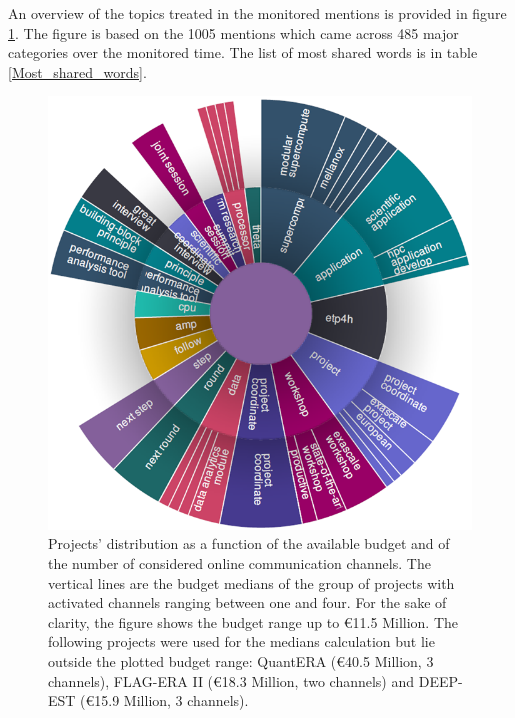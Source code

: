 An overview of the topics treated in the monitored mentions is provided in figure \ref{HPC_word_burst}. The figure is based on the 1005 mentions which came across 485 major categories over the monitored time. The list of most shared words is in table \ref{Most_shared_words}. 

\begin{figure}[!t] 
 \begin{center}
 \includegraphics[scale=0.55]{Images/HPC_word_burst.png}
 \caption{Projects' distribution as a function of the available budget and of the number of considered online communication channels. The vertical lines are the budget medians of the group of projects with activated channels ranging between one and four. For the sake of clarity, the figure shows the budget range up to \euro 11.5 Million. The following projects were used for the medians calculation but lie outside the plotted budget range: QuantERA (\euro 40.5 Million, 3 channels), FLAG-ERA II (\euro 18.3 Million, two channels) and DEEP-EST (\euro 15.9 Million, 3 channels).}
 \label{HPC_word_burst}
 \end{center}
\end{figure}

